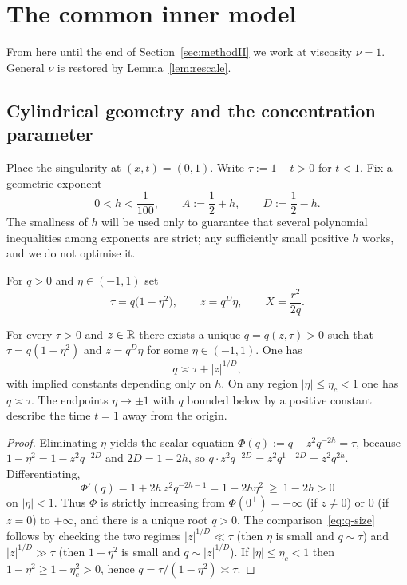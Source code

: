 \section{The common inner model}
\label{sec:model}

From here until the end of Section~\ref{sec:methodII} we work at viscosity $\nu=1$. General $\nu$ is restored by Lemma~\ref{lem:rescale}.

\subsection{Cylindrical geometry and the concentration parameter}
\label{sec:sim-coords}

Place the singularity at $(x,t)=(0,1)$. Write $\tau:=1-t>0$ for $t<1$. Fix a geometric exponent
\begin{equation}
\label{eq:h}
0<h<\frac1{100},
\qquad
A:=\frac12+h,
\qquad
D:=\frac12-h.
\end{equation}
The smallness of $h$ will be used only to guarantee that several polynomial inequalities among exponents are strict; any sufficiently small positive $h$ works, and we do not optimise it.

\begin{definition}
\label{def:sim}
For $q>0$ and $\eta\in(-1,1)$ set
\begin{equation}
\label{eq:sim}
\tau=q\bigl(1-\eta^2\bigr),
\qquad
z=q^{D}\eta,
\qquad
X=\frac{r^2}{2q}.
\end{equation}
\end{definition}

\begin{lemma}
\label{lem:invert}
For every $\tau>0$ and $z\in\mathbb{R}$ there exists a unique $q=q(z,\tau)>0$ such that $\tau=q(1-\eta^2)$ and $z=q^D\eta$ for some $\eta\in(-1,1)$. One has
\begin{equation}
\label{eq:q-size}
q\asymp \tau+|z|^{1/D},
\end{equation}
with implied constants depending only on $h$. On any region $|\eta|\le\eta_c<1$ one has $q\asymp\tau$. The endpoints $\eta\to\pm 1$ with $q$ bounded below by a positive constant describe the time $t=1$ away from the origin.
\end{lemma}

\begin{proof}
Eliminating $\eta$ yields the scalar equation $\Phi(q):=q-z^2 q^{-2h}=\tau$, because $1-\eta^2=1-z^2 q^{-2D}$ and $2D=1-2h$, so $q\cdot z^2 q^{-2D}=z^2 q^{1-2D}=z^2 q^{2h}$. Differentiating,
\[
\Phi'(q)=1+2h\,z^2 q^{-2h-1}=1-2h\eta^2\ \ge\ 1-2h>0
\]
on $|\eta|<1$. Thus $\Phi$ is strictly increasing from $\Phi(0^+)=-\infty$ (if $z\neq 0$) or $0$ (if $z=0$) to $+\infty$, and there is a unique root $q>0$. The comparison~\eqref{eq:q-size} follows by checking the two regimes $|z|^{1/D}\ll\tau$ (then $\eta$ is small and $q\sim\tau$) and $|z|^{1/D}\gg\tau$ (then $1-\eta^2$ is small and $q\sim|z|^{1/D}$). If $|\eta|\le\eta_c<1$ then $1-\eta^2\ge 1-\eta_c^2>0$, hence $q=\tau/(1-\eta^2)\asymp\tau$.
\end{proof}

